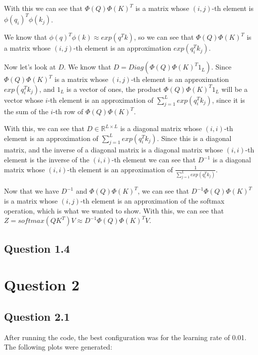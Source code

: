 \documentclass{article}
\begin{document}
With this we can see that $\Phi(Q) \Phi(K)^T$ is a matrix whose $(i,j)$-th element is $\phi(q_i)^T \phi(k_j)$.

We know that $\phi(q)^T\phi(k) \approx exp(q^Tk)$, so we can see that $\Phi(Q) \Phi(K)^T$ is a matrix whose $(i,j)$-th element is an 
approximation $exp(q_i^Tk_j)$.

\bigskip

Now let's look at $D$. We know that $D = Diag(\Phi(Q) \Phi(K)^T 1_L)$. Since $\Phi(Q) \Phi(K)^T$ is a matrix whose $(i,j)$-th element is an
approximation $exp(q_i^Tk_j)$, and $1_L$ is a vector of ones, the product $\Phi(Q) \Phi(K)^T 1_L$ will be a vector whose $i$-th element
is an approximation of $\sum_{j=1}^L exp(q_i^Tk_j)$, since it is the sum of the $i$-th row of $\Phi(Q) \Phi(K)^T$.

With this, we can see that $D \in \mathbb{R}^{L\times L}$ is a diagonal matrix whose $(i, i)$-th element is an approximation of $\sum_{j=1}^L exp(q_i^Tk_j)$.
Since this is a diagonal matrix, and the inverse of a diagonal matrix is a diagonal matrix whose $(i, i)$-th element is the inverse of the $(i, i)$-th element
we can see that $D^{-1}$ is a diagonal matrix whose $(i, i)$-th element is an approximation of $\frac{1}{\sum_{j=1}^L exp(q_i^Tk_j)}$.

\bigskip

Now that we have $D^{-1}$ and $\Phi(Q) \Phi(K)^T$, we can see that $D^{-1}\Phi(Q) \Phi(K)^T$ is a matrix whose $(i,j)$-th element is an approximation of
the softmax operation, which is what we wanted to show. With this, we can see that $Z = softmax(QK^T)V \approx D^{-1}\Phi(Q) \Phi(K)^T V$.

\subsection{Question 1.4}

\section{Question 2}

\subsection{Question 2.1}
After running the code, the best configuration was for the learning rate of 0.01.
The following plots were generated:
\end{document}
